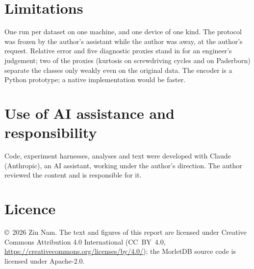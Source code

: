 \documentclass[sigconf,nonacm]{acmart}
\begin{document}
\section{Limitations}
One run per dataset on one machine, and one device of one kind. The protocol was frozen by the author's assistant while the author was away, at the author's request. Relative error and five diagnostic proxies stand in for an engineer's judgement; two of the proxies (kurtosis on screwdriving cycles and on Paderborn) separate the classes only weakly even on the original data. The encoder is a Python prototype; a native implementation would be faster.

\section*{Use of AI assistance and responsibility}
Code, experiment harnesses, analyses and text were developed with Claude (Anthropic), an AI assistant, working under the author's direction. The author reviewed the content and is responsible for it.

\section*{Licence}
\copyright~2026 Zin Nam. The text and figures of this report are licensed under Creative Commons Attribution 4.0 International (CC~BY~4.0, \url{https://creativecommons.org/licenses/by/4.0/}); the MorletDB source code is licensed under Apache-2.0.



\end{document}
